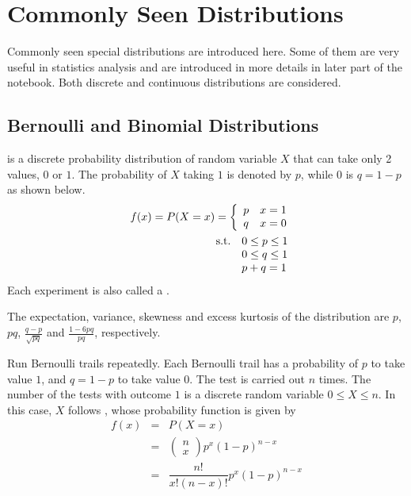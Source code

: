 \chapter{Commonly Seen Distributions} \label{ch:commondistribution}

Commonly seen special distributions are introduced here. Some of them are very useful in statistics analysis and are introduced in more details in later part of the notebook. Both discrete and continuous distributions are considered.

\section{Bernoulli and Binomial Distributions}

 is a discrete probability distribution of random variable $X$ that can take only 2 values, $0$ or $1$. The probability of $X$ taking $1$ is denoted by $p$, while $0$ is $q=1-p$ as shown below.
\begin{eqnarray}
	&& f(x) = P(X=x) = \left\{\begin{array}{cc}
		p & x=1 \\
		q & x=0
	\end{array}\right. \nonumber \\
	&& \begin{array}{ll}
		\textup{s.t.} & 0\leq p \leq 1 \\
		& 0\leq q \leq 1 \\
		& p+q=1 \nonumber
	\end{array}
\end{eqnarray}
Each experiment is also called a .

The expectation, variance, skewness and excess kurtosis of the distribution are $p$, $pq$, $\frac{q-p}{\sqrt{pq}}$ and $\frac{1-6pq}{pq}$, respectively.

Run Bernoulli trails repeatedly. Each Bernoulli trail has a probability of $p$ to take value $1$, and $q=1-p$ to take value $0$. The test is carried out $n$ times. The number of the tests with outcome $1$ is a discrete random variable $0\leq X \leq n$. In this case, $X$ follows , whose probability function is given by
\begin{eqnarray}
	f(x) &=& P(X=x) \nonumber \\
	&=& \left(\begin{array}{c}
		n \\
		x
	\end{array}\right)p^x(1-p)^{n-x} \nonumber \\
	&=& \dfrac{n!}{x!(n-x)!}p^x(1-p)^{n-x}
\end{eqnarray}


